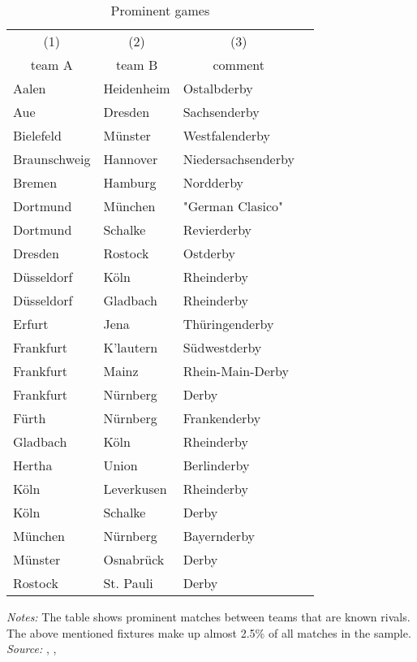 \documentclass[11pt, a4paper]{article} %
\begin{document}
\vspace*{\fill}
\begin{table}[H]\centering
	\begin{threeparttable}\centering \caption{Prominent games}\label{tab_soc_ext:prominent_games_derbies}
		\begin{tabular}{lllc}
			\toprule
			\multicolumn{1}{c}{(1)}&\multicolumn{1}{c}{(2)}&\multicolumn{1}{c}{(3)}\\
			\multicolumn{1}{c}{team A} & \multicolumn{1}{c}{team B} & \multicolumn{1}{c}{comment} \\
			\midrule
			Aalen 		& Heidenheim& Ostalbderby \\
			Aue			& Dresden	& Sachsenderby \\
			Bielefeld	& Münster	& Westfalenderby \\
			Braunschweig& Hannover	& Niedersachsenderby \\
			Bremen		& Hamburg	& Nordderby \\
			Dortmund	& München	& "German Clasico" \\
			Dortmund 	& Schalke 	& Revierderby \\
			Dresden		& Rostock	& Ostderby \\
			Düsseldorf	& Köln		& Rheinderby \\
			Düsseldorf	& Gladbach	& Rheinderby \\
			Erfurt		& Jena		& Thüringenderby \\
			Frankfurt	& K'lautern	& Südwestderby \\
			Frankfurt	& Mainz		& Rhein-Main-Derby \\
			Frankfurt	& Nürnberg	& Derby \\
			Fürth		& Nürnberg	& Frankenderby \\
			Gladbach 	& Köln		& Rheinderby \\
			Hertha		& Union		& Berlinderby \\
			Köln		& Leverkusen& Rheinderby \\
			Köln		& Schalke	& Derby \\
			München		& Nürnberg	& Bayernderby \\
			Münster		& Osnabrück	& Derby \\
			Rostock		& St. Pauli & Derby \\
			\bottomrule
		\end{tabular}
		\begin{tablenotes}
			\item \scriptsize \emph{Notes:} The table shows prominent matches between teams that are known rivals. The above mentioned fixtures make up almost 2.5\% of all matches in the sample. \newline \emph{Source:} \cite{spiegel_rivals}, \cite{90min}, \cite{derbyorg}
		\end{tablenotes}
	\end{threeparttable}
\end{table}
\vspace*{\fill}\clearpage
\end{document}
